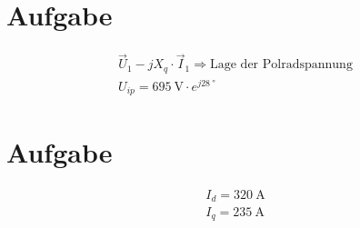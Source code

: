 \documentclass[10pt,a4paper]{article}
\begin{document}
\section{Aufgabe}
\begin{align*}
\vec U_1 -jX_q\cdot \vec I_1 \Rightarrow \text{Lage der Polradspannung}\\
U_{ip} = \SI{695}{\volt} \cdot e^{j\SI{28}{\degree}}
\end{align*}

\section{Aufgabe}
\begin{align*}
I_d = \SI{320}{\ampere}\\
I_q = \SI{235}{\ampere}
\end{align*}
\end{document}
